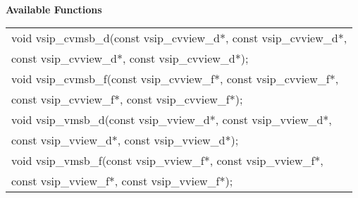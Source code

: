\\\cvsiplh
\newline \hspace*{.8cm} \vspace*{.1cm} \textbf{Available Functions }
\newline \hspace*{1.1cm} {
\ttfamily
\begin{tabular}[H]{l}
void vsip\_cvmsb\_d(const vsip\_cvview\_d*, const vsip\_cvview\_d*,\\*\hspace{.7cm}const vsip\_cvview\_d*, const vsip\_cvview\_d*);\\
void vsip\_cvmsb\_f(const vsip\_cvview\_f*, const vsip\_cvview\_f*,\\*\hspace{.7cm}const vsip\_cvview\_f*, const vsip\_cvview\_f*); \\
void vsip\_vmsb\_d(const vsip\_vview\_d*, const vsip\_vview\_d*,\\*\hspace{.7cm}const vsip\_vview\_d*, const vsip\_vview\_d*); \\
void vsip\_vmsb\_f(const vsip\_vview\_f*, const vsip\_vview\_f*,\\*\hspace{.7cm}const vsip\_vview\_f*, const vsip\_vview\_f*); \\
\end{tabular}
}
\\\pyjvsiph
{}
